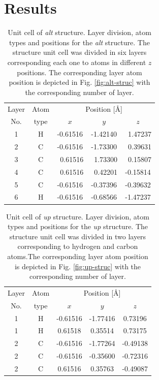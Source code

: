 \documentclass[prb,11pt,tightenlines,twocolumn,aps]{revtex4-1}
\begin{document}
\section{Results} %
\label{sec:results}

\begin{table}[t]
\center
\begin{tabular}{ccccc}\\
\hline
\quad Layer \quad & \quad Atom \qquad & \multicolumn{3}{c}{Position [\AA]} \\
\cline{3-5}
\quad No.   \quad & \quad type \qquad & $x$ & $y$ & $z$  \\
\hline
1 & H &  -0.61516 &  -1.42140 & \ 1.47237 \\
2 & C &  -0.61516 &  -1.73300 & \ 0.39631 \\
3 & C & \ 0.61516 & \ 1.73300 & \ 0.15807 \\
4 & C & \ 0.61516 & \ 0.42201 &  -0.15814 \\
5 & C &  -0.61516 &  -0.37396 &  -0.39632 \\
6 & H &  -0.61516 &  -0.68566 &  -1.47237 \\
\hline
\end{tabular}

\caption{Unit cell of \emph{alt} structure. Layer division, atom types and
positions for the \emph{alt} structure. The structure unit cell was divided in
six layers corresponding each one to atoms in different $z$ positions. The
corresponding layer atom position is depicted in Fig. \ref{fig:alt-struc} with
the corresponding number of layer.}
\label{tab:alt-unitcell}
\end{table}
% 
\begin{table}[t]
\center
\begin{tabular}{ccccc}\\
\hline
\quad Layer \quad & \quad Atom \qquad & \multicolumn{3}{c}{Position [\AA]} \\
\cline{3-5}
\quad No.   \quad & \quad type \qquad & $x$ & $y$ & $z$  \\
\hline
1 & H & -0.61516 & -1.77416 &  0.73196 \\
1 & H &  0.61518 &  0.35514 &  0.73175 \\
2 & C & -0.61516 & -1.77264 & -0.49138 \\
2 & C & -0.61516 & -0.35600 & -0.72316 \\
2 & C &  0.61516 &  0.35763 & -0.49087 \\
\hline
\end{tabular}

\caption{Unit cell of \emph{up} structure. Layer division, atom types and
positions for the \emph{up} structure. The structure unit cell was divided in
two layers corresponding to hydrogen and carbon atoms.The corresponding layer
atom position is depicted in Fig. \ref{fig:up-struc} with the corresponding
number of layer.}
\label{tab:up-unitcell}
\end{table}
\end{document}
